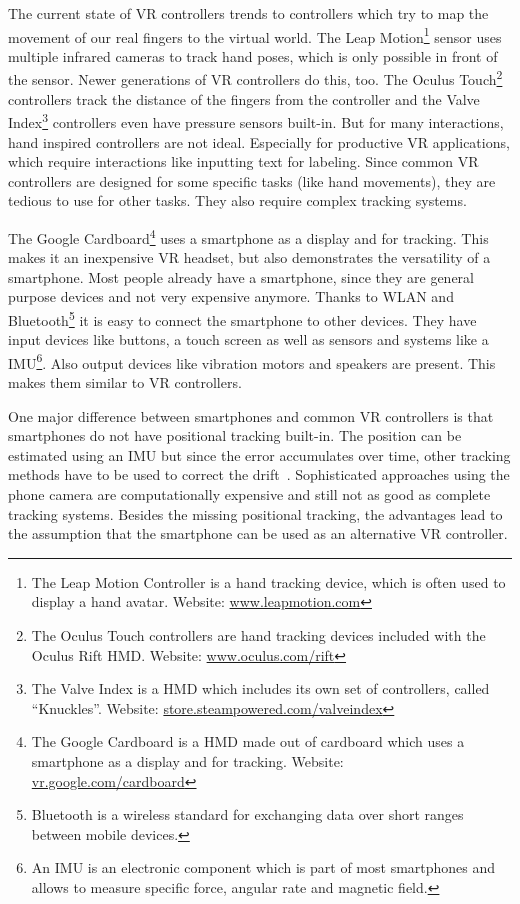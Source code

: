 The current state of \ac{VR} controllers trends to controllers which try to map the movement of our real fingers to the virtual world. The Leap Motion\footnote{The Leap Motion Controller is a hand tracking device, which is often used to display a hand avatar. Website: \href{https://www.leapmotion.com/}{www.leapmotion.com}} sensor uses multiple infrared cameras to track hand poses, which is only possible in front of the sensor. Newer generations of \ac{VR} controllers do this, too. The Oculus Touch\footnote{The Oculus Touch controllers are hand tracking devices included with the Oculus Rift \ac{HMD}. Website: \href{https://www.oculus.com/rift/}{www.oculus.com/rift}} controllers track the distance of the fingers from the controller and the Valve Index\footnote{The Valve Index is a \ac{HMD} which includes its own set of controllers, called \enquote{Knuckles}. Website: \href{https://store.steampowered.com/valveindex}{store.steampowered.com/valveindex}} controllers even have pressure sensors built-in.
But for many interactions, hand inspired controllers are not ideal. Especially for productive \ac{VR} applications, which require interactions like inputting text for labeling. Since common \ac{VR} controllers are designed for some specific tasks (like hand movements), they are tedious to use for other tasks. They also require complex tracking systems. 

The Google Cardboard\footnote{The Google Cardboard is a \ac{HMD} made out of cardboard which uses a smartphone as a display and for tracking. Website: \href{https://vr.google.com/cardboard/}{vr.google.com/cardboard}} uses a smartphone as a display and for tracking. This makes it an inexpensive \ac{VR} headset, but also demonstrates the versatility of a smartphone. Most people already have a smartphone, since they are general purpose devices and not very expensive anymore. Thanks to \ac{WLAN} and Bluetooth\footnote{Bluetooth is a wireless standard for exchanging data over short ranges between mobile devices.} it is easy to connect the smartphone to other devices. They have input devices like buttons, a touch screen as well as sensors and systems like a \ac{IMU}\footnote{An IMU is an electronic component which is part of most smartphones and allows to measure specific force, angular rate and magnetic field.}. Also output devices like vibration motors and speakers are present. This makes them similar to \ac{VR} controllers. 

One major difference between smartphones and common \ac{VR} controllers is that smartphones do not have positional tracking built-in. The position can be estimated using an \ac{IMU} but since the error accumulates over time, other tracking methods have to be used to correct the drift~\cite{Zhang.2015}. Sophisticated approaches using the phone camera are computationally expensive and still not as good as complete tracking systems.
Besides the missing positional tracking, the advantages lead to the assumption that the smartphone can be used as an alternative \ac{VR} controller. 


